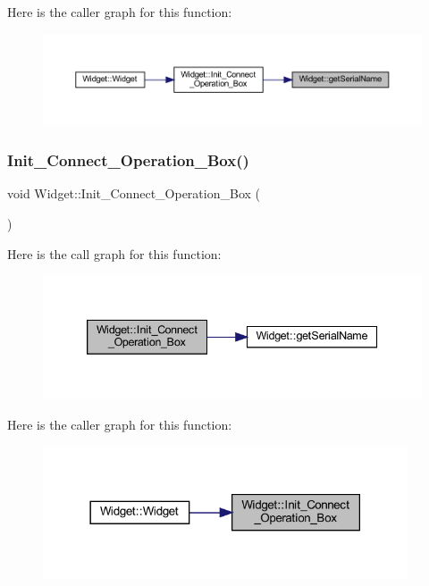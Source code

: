 Here is the caller graph for this function\+:
\nopagebreak
\begin{figure}[H]
\begin{center}
\leavevmode
\includegraphics[width=350pt]{class_widget_afb97de9294ffdbb2c64ed1f96aea9261_icgraph}
\end{center}
\end{figure}
\mbox{\label{class_widget_a73ede9961382ea942361e9845fa11aa0}} 
\subsubsection{\texorpdfstring{Init\_Connect\_Operation\_Box()}{Init\_Connect\_Operation\_Box()}}
{\footnotesize\ttfamily void Widget\+::\+Init\+\_\+\+Connect\+\_\+\+Operation\+\_\+\+Box (\begin{DoxyParamCaption}{ }\end{DoxyParamCaption})}

Here is the call graph for this function\+:
\nopagebreak
\begin{figure}[H]
\begin{center}
\leavevmode
\includegraphics[width=339pt]{class_widget_a73ede9961382ea942361e9845fa11aa0_cgraph}
\end{center}
\end{figure}
Here is the caller graph for this function\+:
\nopagebreak
\begin{figure}[H]
\begin{center}
\leavevmode
\includegraphics[width=306pt]{class_widget_a73ede9961382ea942361e9845fa11aa0_icgraph}
\end{center}
\end{figure}
\mbox{\label{class_widget_a07120b41431597f8e2d0eb86098a6ba7}} 
